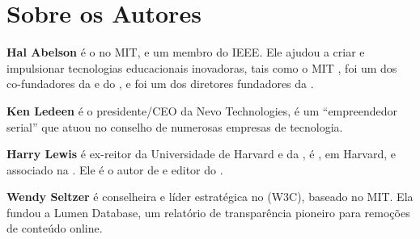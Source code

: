 \chapter{Sobre os Autores}
\label{chap:sobre}

\textbf{Hal Abelson} é o  no MIT, e um membro do IEEE. Ele ajudou a criar e impulsionar
tecnologias educacionais inovadoras, tais como o MIT ,
foi um dos co-fundadores da  e do , e foi um dos diretores fundadores da .

\vspace{1cm}
\noindent \textbf{Ken Ledeen} é o presidente/CEO da Nevo Technologies, é um
``empreendedor serial'' que atuou no conselho de numerosas empresas de
tecnologia.

\vspace{1cm}
\noindent \textbf{Harry Lewis} é ex-reitor da Universidade de Harvard e da
, é , em Harvard, e associado na
. Ele é o autor de
 e
editor do .

\vspace{1cm}
\noindent \textbf{Wendy Seltzer} é conselheira e líder estratégica no
 (W3C), baseado no MIT. Ela fundou a Lumen
Database, um relatório de transparência pioneiro para remoções de conteúdo
online.

